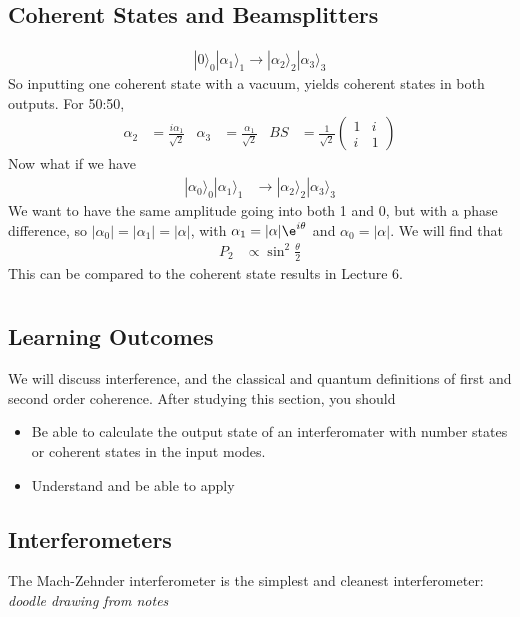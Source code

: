 \documentclass[a4paper, 11pt, normalem]{report}
\begin{document}
\section{Coherent States and Beamsplitters}
\begin{figure}[H]
    \centering
\end{figure}
\begin{align}
    |0\rangle_0|\alpha_1\rangle_1 \to |\alpha_2\rangle_2|\alpha_3\rangle_3 
\end{align}
So inputting one coherent state with a vacuum, yields coherent states in both outputs.
For 50:50,
\begin{align}
    \alpha_2 &= \frac{i\alpha_1}{\sqrt{2}} & \alpha_3 &= \frac{\alpha_1}{\sqrt{2}} & BS &= \frac{1}{\sqrt{2}}\begin{pmatrix} 1 & i \\ i & 1\end{pmatrix}
\end{align}
Now what if we have
\begin{align}
    |\alpha_0\rangle_0|\alpha_1\rangle_1 &\to |\alpha_2\rangle_2|\alpha_3\rangle_3 
\end{align}
We want to have the same amplitude going into both 1 and 0, but with a phase difference, so $|\alpha_0| = |\alpha_1| = |\alpha|$, with $\alpha_1 = |\alpha|\e^{i\theta}$ and $\alpha_0=|\alpha|$.
We will find that
\begin{align}
    P_2 &\propto \sin^2\frac{\theta}{2}
\end{align}
This can be compared to the coherent state results in Lecture 6. 

\chapter{}
\section{Learning Outcomes}
We will discuss interference, and the classical and quantum definitions of first and second order coherence. 
After studying this section, you should
\begin{itemize}
    \item Be able to calculate the output state of an interferomater with number states or coherent states in the input modes.
    \item Understand and be able to apply
\end{itemize}

\section{Interferometers}
The Mach-Zehnder interferometer is the simplest and cleanest interferometer:
\textit{doodle drawing from notes}
\end{document}
